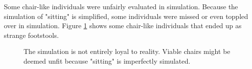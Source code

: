 Some chair-like individuals were unfairly evaluated in simulation. Because the
simulation of "sitting" is simplified, some individuals were missed or even
toppled over in simulation. Figure \ref{fig:footstools} shows some chair-like
individuals that ended up as strange footstools.

\begin{figure}[ht]
	\centering
	 \hfil
	\caption{The simulation is not entirely loyal to reality. Viable chairs
	might be deemed unfit because "sitting" is imperfectly simulated.}
	\label{fig:footstools}
\end{figure}
